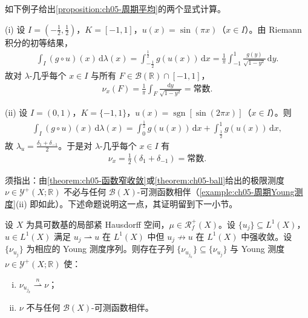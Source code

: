 \documentclass[../../main.tex]{subfiles}%
\begin{document}
如下例子给出\cref{proposition:ch05-周期平均}的两个显式计算。

\begin{example}\label{example:ch05-周期Young测度}
(i) 设 $I=(-\tfrac12,\tfrac12)$，$K=[-1,1]$，$u(x)=\sin(\pi x)$（$x\in I$）。由 Riemann 积分的初等结果，
\begin{align*}
\int_I(g\circ u)(x)\,\mathrm{d}\lambda(x)=\int_{-\frac12}^{\frac12}g(u(x))\,\mathrm{d}x
=\frac{1}{\pi}\int_{-1}^1\frac{g(y)}{\sqrt{1-y^2}}\,\mathrm{d}y.
\end{align*}
故对 $\lambda$-几乎每个 $x\in I$ 与所有 $F\in\mathscr{B}(\mathbb{R})\cap[-1,1]$，
\begin{align*}
\nu_x(F)=\frac{1}{\pi}\int_F\frac{\mathrm{d}y}{\sqrt{1-y^2}}=\text{常数}.
\end{align*}

(ii) 设 $I=(0,1)$，$K=\{-1,1\}$，$u(x)=\operatorname{sgn}[\sin(2\pi x)]$（$x\in I$）。则
\begin{align*}
\int_I(g\circ u)(x)\,\mathrm{d}\lambda(x)=\int_0^{\frac12}g(u(x))\,\mathrm{d}x+\int_{\frac12}^1g(u(x))\,\mathrm{d}x,
\end{align*}
故 $\lambda_u=\frac{\delta_1+\delta_{-1}}{2}$。于是对 $\lambda$-几乎每个 $x\in I$ 有
\begin{align*}
\nu_x=\frac12(\delta_1+\delta_{-1})=\text{常数}.
\end{align*}
\end{example}

须指出：由\cref{theorem:ch05-函数窄收敛}或\cref{theorem:ch05-ball}给出的极限测度 $\nu\in\mathcal{Y}^+(X;\mathbb{R})$ 不必与任何 $\mathscr{B}(X)$-可测函数相伴（\cref{example:ch05-周期Young测度}(ii) 即如此）。下述命题说明这一点，其证明留到下一小节。

\begin{proposition}\label{proposition:ch05-非相伴}
设 $X$ 为具可数基的局部紧 Hausdorff 空间，$\mu\in\mathscr{R}^+_f(X)$。设 $\{u_j\}\subseteq L^1(X)$，$u\in L^1(X)$ 满足 $u_j\rightharpoonup u$ 在 $L^1(X)$ 中但 $u_j\not\to u$ 在 $L^1(X)$ 中强收敛。设 $\{\nu_{u_j}\}$ 为相应的 Young 测度序列。则存在子列 $\{\nu_{u_{j_k}}\}\subseteq\{\nu_{u_j}\}$ 与 Young 测度 $\nu\in\mathcal{Y}^+(X;\mathbb{R})$ 使：
\begin{enumerate}[(i)]
\item\label{item:ch05-nonassoc-i} $\nu_{u_{j_k}}\stackrel{n}{\rightharpoonup}\nu$；
\item\label{item:ch05-nonassoc-ii} $\nu$ 不与任何 $\mathscr{B}(X)$-可测函数相伴。
\end{enumerate}
\end{proposition}
\end{document}
